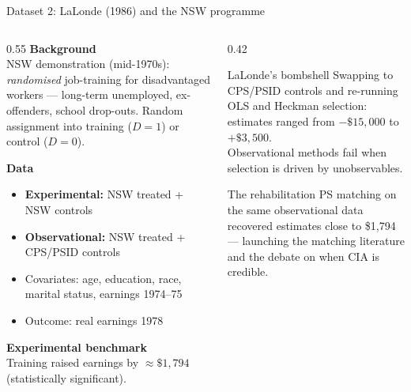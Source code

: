 \documentclass[aspectratio=169, 10pt]{beamer}
\begin{document}
\begin{frame}[shrink=8]{Dataset 2: LaLonde (1986) and the NSW programme}

  \begin{columns}[T]
    \begin{column}{0.55\textwidth}
      \textbf{Background}\\[3pt]
      NSW demonstration (mid-1970s): \emph{randomised} job-training for disadvantaged workers — long-term unemployed, ex-offenders, school drop-outs. Random assignment into training ($D=1$) or control ($D=0$).

      \smallskip
      \textbf{Data} \citep{lalonde1986}\\[3pt]
      \begin{itemize}
        \item \textbf{Experimental:} NSW treated + NSW controls
        \item \textbf{Observational:} NSW treated + CPS/PSID controls
        \item Covariates: age, education, race, marital status, earnings 1974--75
        \item Outcome: real earnings 1978
      \end{itemize}

      \smallskip
      \textbf{Experimental benchmark}\\[3pt]
      Training raised earnings by $\approx\$1{,}794$ (statistically significant).
    \end{column}
    \begin{column}{0.42\textwidth}
      \begin{alertblock}{LaLonde's bombshell \citep{lalonde1986}}
        Swapping to CPS/PSID controls and re-running OLS and Heckman selection: estimates ranged from $-\$15{,}000$ to $+\$3{,}500$.\\[3pt]
        Observational methods fail when selection is driven by unobservables.
      \end{alertblock}
      \smallskip
      \begin{block}{The rehabilitation \citep{dehejia2002}}
        PS matching on the same observational data recovered estimates close to \$1{,}794 — launching the matching literature and the debate on when CIA is credible.
      \end{block}
    \end{column}
  \end{columns}

\end{frame}
\end{document}
